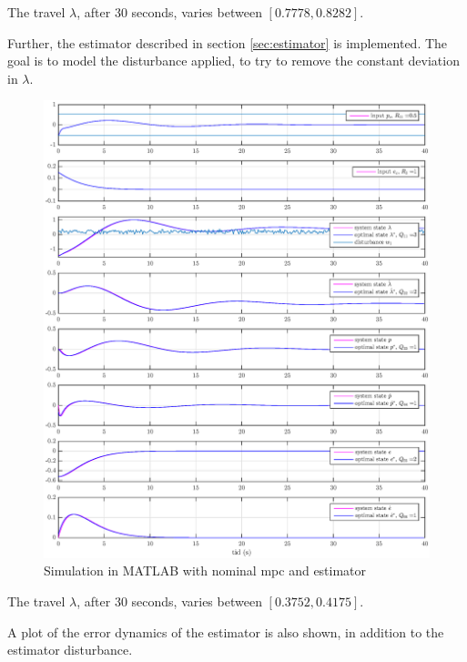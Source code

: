 The travel $\lambda$, after 30 seconds, varies between $[0.7778, 0.8282]$. 

Further, the estimator described in section \ref{sec:estimator} is implemented. The goal is to model the disturbance applied, to try to remove the constant deviation in $\lambda$. 

\begin{figure}[h!]
    \centering
    \includegraphics[scale=0.4]{fig/heli_sim_est_not_stable_extended_horizon.eps}
    \caption{Simulation in MATLAB with nominal \acrshort{mpc} and estimator}
    \label{fig:my_label}
\end{figure}

The travel $\lambda$, after 30 seconds, varies between $[0.3752, 0.4175]$. 

A plot of the error dynamics of the estimator is also shown, in addition to the estimator disturbance.

